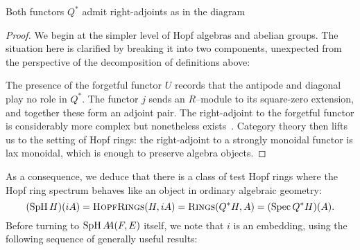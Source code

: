 \begin{corollary}
Both functors \(Q^*\) admit right-adjoints as in the diagram
\begin{center}
\end{center}
\end{corollary}
\begin{proof}
We begin at the simpler level of Hopf algebras and abelian groups.  The situation here is clarified by breaking it into two components, unexpected from the perspective of the decomposition of definitions above:
\begin{center}
\end{center}
The presence of the forgetful functor \(U\) records that the antipode and diagonal play no role in \(Q^*\).  The functor \(j\) sends an \(R\)--module to its square-zero extension, and together these form an adjoint pair.  The right-adjoint to the forgetful functor is considerably more complex but nonetheless exists~\cite{Fox}.  Category theory then lifts us to the setting of Hopf rings: the right-adjoint to a strongly monoidal functor is lax monoidal, which is enough to preserve algebra objects.
\end{proof}

As a consequence, we deduce that there is a class of test Hopf rings where the Hopf ring spectrum behaves like an object in ordinary algebraic geometry: \[(\operatorname{SpH} H)(iA) = \normalfont\textsc{HopfRings}(H, iA) = \normalfont\textsc{Rings}(Q^* H, A) = (\operatorname{Spec} Q^* H)(A).\]  Before turning to \(\operatorname{SpH} A\!\!A(F, E)\) itself, we note that \(i\) is an embedding, using the following sequence of generally useful results:

